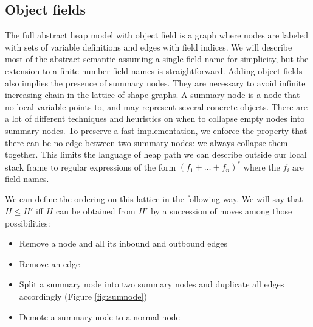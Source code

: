 \documentclass[11pt]{article}
\begin{document}
\subsection*{Object fields}

The full abstract heap model with object field is a graph where nodes are labeled with sets of variable definitions and edges with field indices.
We will describe most of the abstract semantic assuming a single field name for simplicity, but the extension to a finite number field names is straightforward.
Adding object fields also implies the presence of summary nodes. They are necessary to avoid infinite increasing chain in the lattice of shape graphs.
A summary node is a node that no local variable points to, and may represent several concrete objects.
There are a lot of different techniques and heuristics on when to collapse empty nodes into summary nodes.
To preserve a fast implementation, we enforce the property that there can be no edge between two summary nodes: we always collapse them together.
This limits the language of heap path we can describe outside our local stack frame to regular expressions of the form $(f_1+\dots+f_n)^*$ where the $f_i$ are field names.

We can define the ordering on this lattice in the following way.
We will say that $H\leq H'$ iff $H$ can be obtained from $H'$ by a succession of moves among those possibilities:
\begin{itemize}
\item Remove a node and all its inbound and outbound edges
\item Remove an edge
\item Split a summary node into two summary nodes and duplicate all edges accordingly (Figure \ref{fig:sumnode})
\item Demote a summary node to a normal node
\end{itemize}
\end{document}
